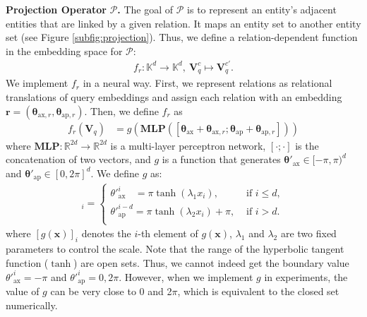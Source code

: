 \documentclass{article}
\newcommand{\gb}[1]{\boldsymbol{#1}}
\newcommand{\taxis}{\text{ax}}
\newcommand{\targ}{\text{ap}}
\begin{document}
\textbf{Projection Operator} $\mathcal{P}$\textbf{.} The goal of $\mathcal{P}$ is to represent an entity's adjacent entities that are linked by a given relation. 
It maps an entity set to another entity set (see Figure \ref{subfig:projection}). Thus, we define a relation-dependent function in the embedding space for $\mathcal{P}$:
\begin{align*}
    f_r:\mathbb{K}^d\rightarrow\mathbb{K}^d,\ \textbf{V}_q^c\mapsto \textbf{V}_q^{c'}.
\end{align*}
We implement $f_r$ in a neural way. First, we represent relations as relational translations of query embeddings and assign each relation with an embedding $\textbf{r}=(\gb{\theta}_{\taxis,r}, \gb{\theta}_{\targ,r})$. Then, we define $f_r$ as 
\begin{align}\label{eqn:proj_op}
    f_r(\textbf{V}_q)&=g(\textbf{MLP}([\gb{\theta}_{\taxis}+\gb{\theta}_{\taxis,r};\gb{\theta}_{\targ}+\gb{\theta}_{\targ,r}]))
\end{align}
where $\textbf{MLP}: \mathbb{R}^{2d}\rightarrow\mathbb{R}^{2d}$ is a multi-layer perceptron network, $[\cdot;\cdot]$ is the concatenation of two vectors, and $g$ is a function that generates $\gb{\theta}'_{\taxis}\in[-\pi, \pi)^d$ and $\gb{\theta}'_{\targ}\in[0,2\pi]^d$.
We define $g$ as:
\begin{align*}
[g(\textbf{x})]_i=
\begin{cases}
    \theta'^i_{\taxis}\ \ \ \ =\pi\tanh(\lambda_1 x_i), &\text{ if } i\le d,\\
    \theta'^{i-d}_{\targ}=\pi\tanh(\lambda_2 x_i)+\pi,&\text{ if } i> d.\\
\end{cases}
\end{align*}
where $[g(\textbf{x})]_i$ denotes the $i$-th element of $g(\textbf{x})$, $\lambda_1$ and $\lambda_2$ are two fixed parameters to control the scale.
Note that the range of the hyperbolic tangent function ($\tanh$) are open sets. Thus, we cannot indeed get the boundary value $\theta'^i_{\taxis}=-\pi$ and $\theta'^i_{\targ}=0,2\pi$. However, when we implement $g$ in experiments, the value of $g$ can be very close to 0 and 2$\pi$, which is equivalent to the closed set numerically.
\end{document}
